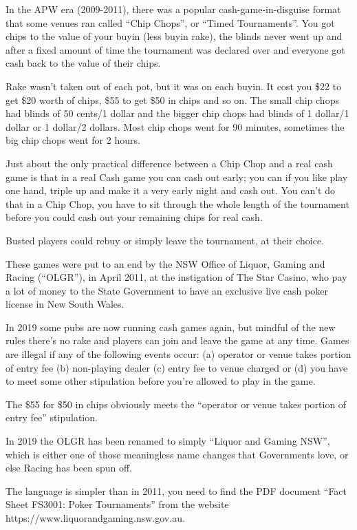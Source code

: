 In the APW era (2009-2011), there was a popular
cash-game-in-disguise format that some venues ran
called ``Chip Chops'', or ``Timed Tournaments''.
You got chips to the value of your buyin (less buyin rake), the blinds
never went up and after a fixed amount of time the tournament was
declared over and everyone got cash back to the value of their chips.

Rake wasn't taken out of each pot, but it was on each buyin.
It cost you \$22 to get \$20 worth of chips, \$55 to get
\$50 in chips and so on. The small chip chops had blinds of
50 cents/1 dollar and the bigger chip chops had blinds of
1 dollar/1 dollar or 1 dollar/2 dollars. Most chip chops went for 90
minutes, sometimes the big chip chops went for 2 hours.

Just about the only practical difference between a
Chip Chop and a real cash game is that in a real Cash game
you can cash out early; you can if you like play one hand,
triple up and make it a very early night and cash out.
You can't do that in a Chip Chop, you have to sit through
the whole length of the tournament before you could cash out your
remaining chips for real cash.

Busted players could rebuy or simply leave the tournament,
at their choice.

These games were put to an end by the NSW Office of Liquor,
Gaming and Racing (``OLGR''), in April 2011, at the instigation of The
Star Casino, who pay a lot of money to the State Government to have an
exclusive live cash poker license in New South Wales.

In 2019 some pubs are now running cash games again, but mindful
of the new rules there's no rake and players can join and leave
the game at any time. Games are illegal if any of the following
events occur: (a) operator or venue takes portion of entry fee
(b) non-playing dealer (c) entry fee to venue charged or
(d) you have to meet some other stipulation before you're allowed
to play in the game.


The \$55 for \$50 in chips obviously meets the ``operator or venue takes
portion of entry fee'' stipulation.

In 2019 the OLGR has been renamed to simply
``Liquor and Gaming NSW'', which is either one of those meaningless
name changes that Governments love, or else Racing has been spun off.

The language is simpler than in 2011, you need to find
the PDF document ``Fact Sheet FS3001: Poker Tournaments'' from
the website https://www.liquorandgaming.nsw.gov.au.

